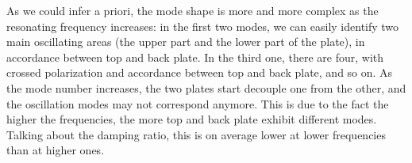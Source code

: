\documentclass[a4paper,12pt,oneside]{article}
\begin{document}
As we could infer a priori, the mode shape is more and more complex as the resonating frequency increases: in the first two modes, we can easily identify two main oscillating areas (the upper part and the lower part of the plate), in accordance between top and back plate. In the third one, there are four, with crossed polarization and accordance between top and back plate, and so on. As the mode number increases, the two plates start decouple one from the other, and the oscillation modes may not correspond anymore. This is due to the fact the higher the frequencies, the more top and back plate exhibit different modes. Talking about the damping ratio, this is on average lower at lower frequencies than at higher ones.
\end{document}
